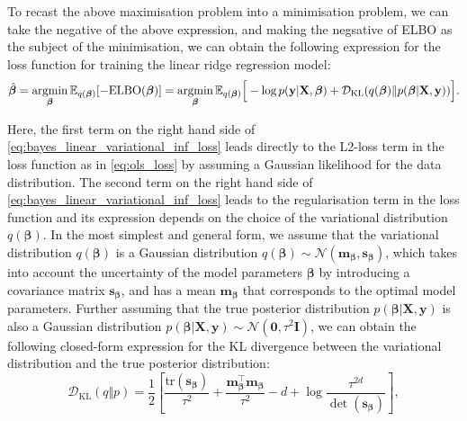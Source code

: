 To recast the above maximisation problem into a minimisation problem, we can take the negative of the above expression, and making the negsative of ELBO as the subject of the minimisation, we can obtain the following expression for the loss function for training the linear ridge regression model:
\begin{equation}
    \label{eq:bayes_linear_variational_inf_loss}        
\hat{\boldsymbol{\beta}} = \operatorname*{argmin}_{\boldsymbol{\beta}} \mathbb{E}_{q(\boldsymbol{\beta})}[-\mathrm{ELBO}(\boldsymbol{\beta})] = \operatorname*{argmin}_{\boldsymbol{\beta}} \mathbb{E}_{q(\boldsymbol{\beta})}\Big[-\log p(\mathbf{y}|\mathbf{X},\boldsymbol{\beta}) + \mathcal{D}_{\mathrm{KL}}(q(\boldsymbol{\beta})\Vert p(\boldsymbol{\beta}|\mathbf{X},\mathbf{y})) \Big].
\end{equation}

Here, the first term on the right hand side of \cref{eq:bayes_linear_variational_inf_loss} leads directly to the L2-loss term in the loss function as in \cref{eq:ols_loss} by assuming a Gaussian likelihood for the data distribution. The second term on the right hand side of \cref{eq:bayes_linear_variational_inf_loss} leads to the regularisation term in the loss function and its expression depends on the choice of the variational distribution $q(\boldsymbol{\beta})$. In the most simplest and general form, we assume that the variational distribution $q(\boldsymbol{\beta})$ is a Gaussian distribution $q(\boldsymbol{\beta})\sim\mathcal{N}(\bm{m}_{\boldsymbol{\beta}},\bm{s}_{\boldsymbol{\beta}})$, which takes into account the uncertainty of the model parameters $\boldsymbol{\beta}$ by introducing a covariance matrix $\bm{s}_{\boldsymbol{\beta}}$, and has a mean $\bm{m}_{\boldsymbol{\beta}}$ that corresponds to the optimal model parameters. Further assuming that the true posterior distribution $p(\boldsymbol{\beta}|\bm{X},\bm{y})$ is also a Gaussian distribution $p(\boldsymbol{\beta}|\bm{X},\bm{y})\sim \mathcal{N}(\bm{0},\tau^2\bm{I})$, we can obtain the following closed-form expression for the KL divergence between the variational distribution and the true posterior distribution:
\begin{equation}
    \label{eq:bayesian_linear_KL_div}
    \mathcal{D}_{\mathrm{KL}}(q\Vert p)= \frac{1}{2}\left[\frac{\mathrm{tr}(\bm{s}_{\boldsymbol{\beta}})}{\tau^2} + \frac{\bm{m}_{\boldsymbol{\beta}}^\top \bm{m}_{\boldsymbol{\beta}}}{\tau^2} - d + \log \frac{\tau^{2d}}{\det(\bm{s}_{\boldsymbol{\beta}})} \right],
\end{equation}

